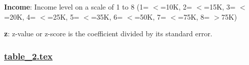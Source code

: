 \documentclass[11pt]{article}
\begin{document}
\begin{codeoutput}
\begin{table}[h]
\caption{Association between diet and the risk of diabetes, adjusted for different confounders.}
\label{table:table_1}
\begin{threeparttable}
\renewcommand{\TPTminimum}{\linewidth}
\makebox[\linewidth]{%
\begin{tabular}{lllllll}
\toprule
 & Coef. & Std.Err & z & P$>$\textbar{}z\textbar{} & [0.025 & 0.975 \\
\midrule
\textbf{Intercept} & -1.67 & 0.0364 & -45.9 & $<$1e-06 & -1.74 & -1.6 \\
\textbf{Fruit} & -0.185 & 0.0126 & -14.6 & $<$1e-06 & -0.209 & -0.16 \\
\textbf{Veggies} & -0.126 & 0.0148 & -8.57 & $<$1e-06 & -0.155 & -0.0975 \\
\textbf{Age} & 0.172 & 0.00218 & 79.2 & $<$1e-06 & 0.168 & 0.177 \\
\textbf{Sex} & 0.32 & 0.0121 & 26.4 & $<$1e-06 & 0.296 & 0.344 \\
\textbf{Education} & -0.131 & 0.00636 & -20.6 & $<$1e-06 & -0.144 & -0.119 \\
\textbf{Income} & -0.162 & 0.00306 & -52.9 & $<$1e-06 & -0.168 & -0.156 \\
\bottomrule
\end{tabular}}
\begin{tablenotes}
\footnotesize
\item \textbf{Income}: Income level on a scale of 1 to 8 (1= $<$=10K, 2= $<$=15K, 3= $<$=20K, 4= $<$=25K, 5= $<$=35K, 6= $<$=50K, 7= $<$=75K, 8= $>$75K)
\item \textbf{z}: z-value or z-score is the coefficient divided by its standard error.
\end{tablenotes}
\end{threeparttable}
\end{table}

\end{codeoutput}

\subsubsection*{\hyperlink{code-LaTeX Table Design-table-2-tex}{table\_2.tex}}
\end{document}
